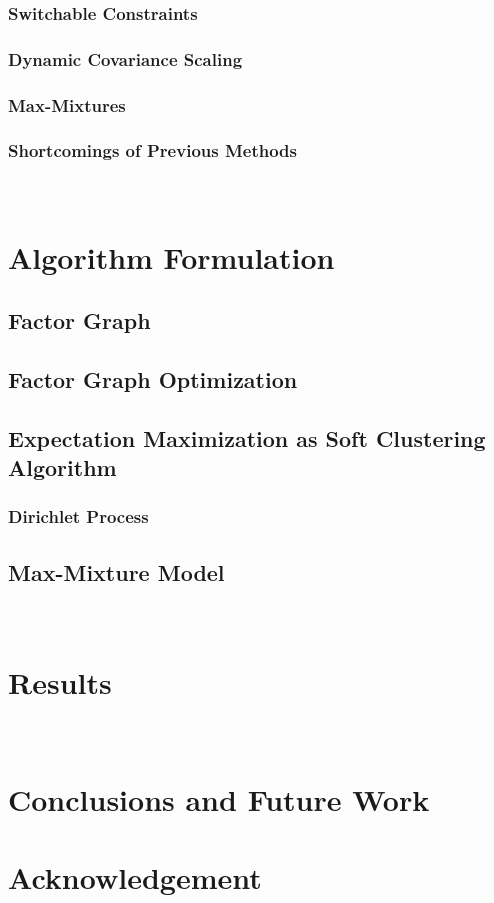 \documentclass{IEEEtran}
\begin{document}
	\subsubsection{Switchable Constraints}

	\subsubsection{Dynamic Covariance Scaling}

	\subsubsection{Max-Mixtures}	

	\subsubsection{Shortcomings of Previous Methods}

\\ 

\section{Algorithm Formulation}

	\subsection{Factor Graph}

	\subsection{Factor Graph Optimization}

	\subsection{Expectation Maximization as Soft Clustering Algorithm}
		
		\subsubsection{Dirichlet Process}

	\subsection{Max-Mixture Model}

\\

\section{Results}

\\ 
 
\section{Conclusions and Future Work}



\section*{Acknowledgement}
\end{document}
